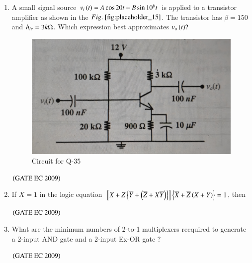 \documentclass[journal,12pt,onecolumn]{IEEEtran}
\theoremstyle{remark}
\begin{document}
\begin{enumerate}[start=1, label={Q\arabic*.}]
\item A small signal source $v_i\left(t\right) = A\cos{20t} + B \sin{10^6t}$ is applied to a transistor amplifier as shown in the $\figref{fig:placeholder_15}$. The transistor has $\beta = 150$ and $h_{ie} = 3k\ohm$. Which expression best approximates $v_o\left(t\right) ?$
\begin{figure}[H]
    \centering
    \includegraphics[width=0.5\columnwidth]{figs/img_15.jpg}
    \caption{\centering Circuit for Q-35}
    \label{fig:placeholder_15}
\end{figure}
\begin{enumerate}
\end{enumerate}
\hfill $\left(\text{GATE EC 2009}\right)$

\item If $X=1$ in the logic equation ${}\left[X + Z\left\{\overline{Y} + \left(\overline{Z} + X\overline{Y}\right)\right\}\right] \left\{\overline{X} + \overline{Z}\left(X+Y\right)\right\} = 1$, then
\begin{enumerate}
\end{enumerate}
\hfill $\left(\text{GATE EC 2009}\right)$

\item What are the minimum numbers of 2-to-1 multiplexers recquired to generate a 2-input AND gate and a 2-input Ex-OR gate ?
\begin{enumerate}
\end{enumerate}
\hfill $\left(\text{GATE EC 2009}\right)$


\end{enumerate}
\end{document}
